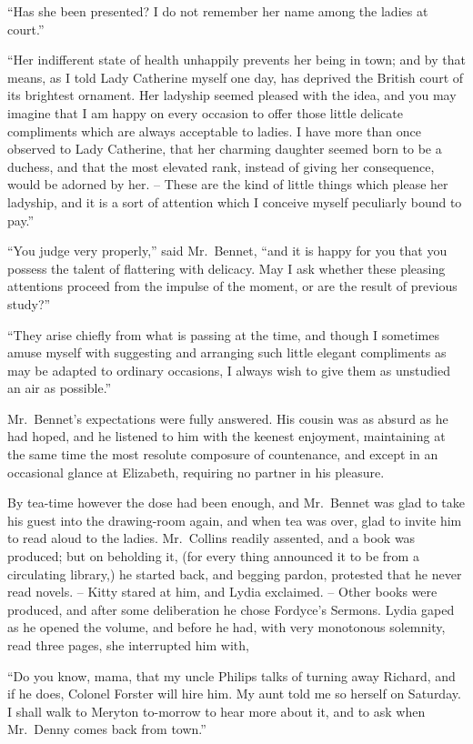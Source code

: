 “Has she been presented? I do not remember her
name among the ladies at court.”

“Her indifferent state of health unhappily prevents
her being in town; and by that means, as I told Lady
Catherine myself one day, has deprived the British court
of its brightest ornament. Her ladyship seemed pleased
with the idea, and you may imagine that I am happy
on every occasion to offer those little delicate compliments
which are always acceptable to ladies. I have
more than once observed to Lady Catherine, that her
charming daughter seemed born to be a duchess, and that
the most elevated rank, instead of giving her consequence,
would be adorned by her. -- These are the kind of little
things which please her ladyship, and it is a sort of
attention which I conceive myself peculiarly bound to
pay.”

“You judge very properly,” said Mr.\ Bennet, “and it
is happy for you that you possess the talent of flattering
with delicacy. May I ask whether these pleasing attentions
proceed from the impulse of the moment, or are the
result of previous study?”

“They arise chiefly from what is passing at the time,
and though I sometimes amuse myself with suggesting
and arranging such little elegant compliments as may be
adapted to ordinary occasions, I always wish to give them
as unstudied an air as possible.”

Mr.\ Bennet’s expectations were fully answered. His
cou\-sin was as absurd as he had hoped, and he listened
to him with the keenest enjoyment, maintaining at the
same time the most resolute composure of countenance,
and except in an occasional glance at Elizabeth, requiring
no partner in his pleasure.

By tea-time however the dose had been enough, and
Mr.\ Bennet was glad to take his guest into the drawing-room
again, and when tea was over, glad to invite him
to read aloud to the ladies. Mr.\ Collins readily assented,
and a book was produced; but on beholding it, (for
every thing announced it to be from a circulating library,)
he started back, and begging pardon, protested that he
never read novels. -- Kitty stared at him, and Lydia
exclaimed. -- Other books were produced, and after some
deliberation he chose Fordyce’s Sermons. Lydia gaped
as he opened the volume, and before he had, with very
monotonous solemnity, read three pages, she interrupted
him with,

“Do you know, mama, that my uncle Philips talks
of turning away Richard, and if he does, Colonel Forster
will hire him. My aunt told me so herself on Saturday.
I shall walk to Meryton to-morrow to hear more about
it, and to ask when Mr.\ Denny comes back from
town.”

